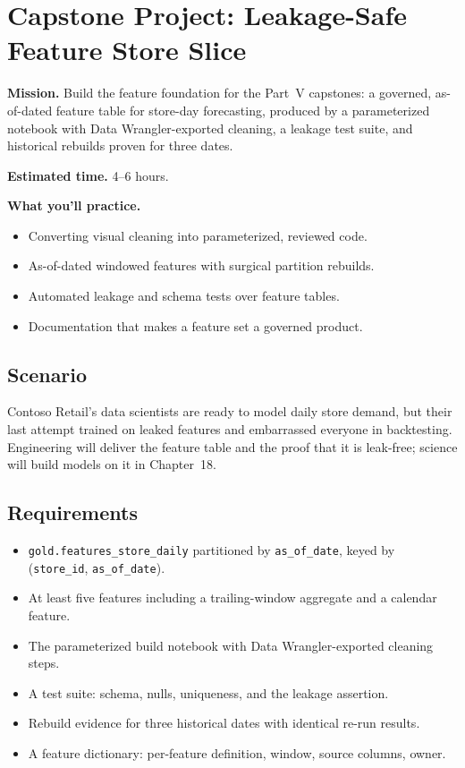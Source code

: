 \section{Capstone Project: Leakage-Safe Feature Store Slice}\label{sec:ch17-capstone}

\begin{capstonebox}
\textbf{Mission.} Build the feature foundation for the Part~V capstones: a governed, as-of-dated feature table for store-day forecasting, produced by a parameterized notebook with Data Wrangler-exported cleaning, a leakage test suite, and historical rebuilds proven for three dates.

\textbf{Estimated time.} 4--6 hours.

\textbf{What you'll practice.}
\begin{itemize}
    \item Converting visual cleaning into parameterized, reviewed code.
    \item As-of-dated windowed features with surgical partition rebuilds.
    \item Automated leakage and schema tests over feature tables.
    \item Documentation that makes a feature set a governed product.
\end{itemize}
\end{capstonebox}

\subsection*{Scenario}
Contoso Retail's data scientists are ready to model daily store demand, but their last attempt trained on leaked features and embarrassed everyone in backtesting. Engineering will deliver the feature table and the proof that it is leak-free; science will build models on it in Chapter~18.

\subsection*{Requirements}
\begin{itemize}
    \item \texttt{gold.features\_store\_daily} partitioned by \texttt{as\_of\_date}, keyed by (\texttt{store\_id}, \texttt{as\_of\_date}).
    \item At least five features including a trailing-window aggregate and a calendar feature.
    \item The parameterized build notebook with Data Wrangler-exported cleaning steps.
    \item A test suite: schema, nulls, uniqueness, and the leakage assertion.
    \item Rebuild evidence for three historical dates with identical re-run results.
    \item A feature dictionary: per-feature definition, window, source columns, owner.
\end{itemize}


